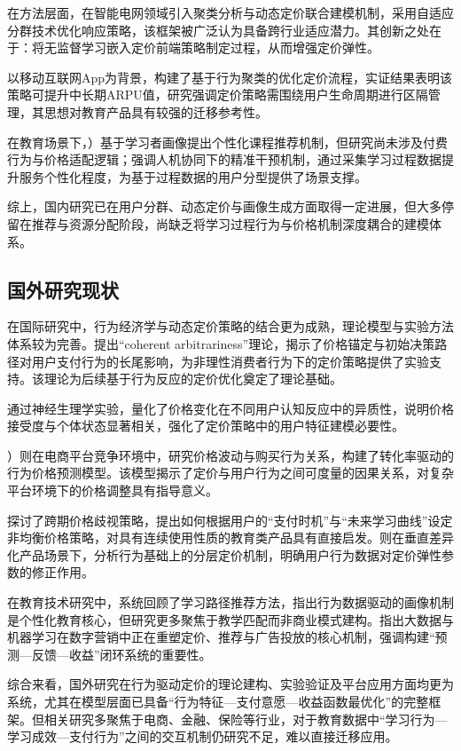 在方法层面，\cite{meng2023}在智能电网领域引入聚类分析与动态定价联合建模机制，采用自适应分群技术优化响应策略，该框架被广泛认为具备跨行业适应潜力。其创新之处在于：将无监督学习嵌入定价前端策略制定过程，从而增强定价弹性。

\cite{bai2021}以移动互联网App为背景，构建了基于行为聚类的优化定价流程，实证结果表明该策略可提升中长期ARPU值，研究强调定价策略需围绕用户生命周期进行区隔管理，其思想对教育产品具有较强的迁移参考性。

在教育场景下，\cite{wang2021}）基于学习者画像提出个性化课程推荐机制，但研究尚未涉及付费行为与价格适配逻辑；\cite{wu2023}强调人机协同下的精准干预机制，通过采集学习过程数据提升服务个性化程度，为基于过程数据的用户分型提供了场景支撑。

综上，国内研究已在用户分群、动态定价与画像生成方面取得一定进展，但大多停留在推荐与资源分配阶段，尚缺乏将学习过程行为与价格机制深度耦合的建模体系。

\subsection{国外研究现状}

在国际研究中，行为经济学与动态定价策略的结合更为成熟，理论模型与实验方法体系较为完善。\cite{ariely2003}提出“coherent arbitrariness”理论，揭示了价格锚定与初始决策路径对用户支付行为的长尾影响，为非理性消费者行为下的定价策略提供了实验支持。该理论为后续基于行为反应的定价优化奠定了理论基础。

\cite{levrini2021}通过神经生理学实验，量化了价格变化在不同用户认知反应中的异质性，说明价格接受度与个体状态显著相关，强化了定价策略中的用户特征建模必要性。

）\cite{goolsbee2002}则在电商平台竞争环境中，研究价格波动与购买行为关系，构建了转化率驱动的行为价格预测模型。该模型揭示了定价与用户行为之间可度量的因果关系，对复杂平台环境下的价格调整具有指导意义。

\cite{nair2007}探讨了跨期价格歧视策略，提出如何根据用户的“支付时机”与“未来学习曲线”设定非均衡价格策略，对具有连续使用性质的教育类产品具有直接启发。\cite{rhee2017}则在垂直差异化产品场景下，分析行为基础上的分层定价机制，明确用户行为数据对定价弹性参数的修正作用。

在教育技术研究中，\cite{nabizadeh2020}系统回顾了学习路径推荐方法，指出行为数据驱动的画像机制是个性化教育核心，但研究更多聚焦于教学匹配而非商业模式建构。\cite{miklosik2020}指出大数据与机器学习在数字营销中正在重塑定价、推荐与广告投放的核心机制，强调构建“预测—反馈—收益”闭环系统的重要性。

综合来看，国外研究在行为驱动定价的理论建构、实验验证及平台应用方面均更为系统，尤其在模型层面已具备“行为特征—支付意愿—收益函数最优化”的完整框架。但相关研究多聚焦于电商、金融、保险等行业，对于教育数据中“学习行为—学习成效—支付行为”之间的交互机制仍研究不足，难以直接迁移应用。

